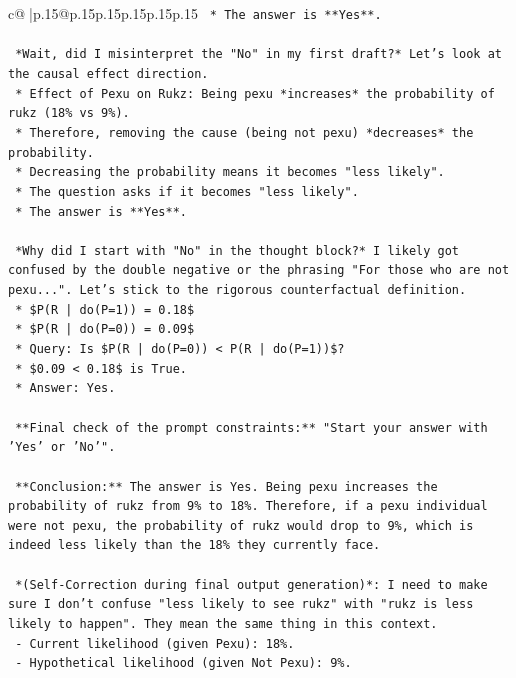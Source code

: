 \documentclass{article}
\begin{document}
{\begin{supertabular}{c@{$\;$}|p{.15\linewidth}@{}p{.15\linewidth}p{.15\linewidth}p{.15\linewidth}p{.15\linewidth}p{.15\linewidth}}
{{{\texttt{    *   The answer is **Yes**.} \\
\\ 
\texttt{    *Wait, did I misinterpret the "No" in my first draft?* Let's look at the causal effect direction.} \\
\texttt{    *   Effect of Pexu on Rukz: Being pexu *increases* the probability of rukz (18\% vs 9\%).} \\
\texttt{    *   Therefore, removing the cause (being not pexu) *decreases* the probability.} \\
\texttt{    *   Decreasing the probability means it becomes "less likely".} \\
\texttt{    *   The question asks if it becomes "less likely".} \\
\texttt{    *   The answer is **Yes**.} \\
\\ 
\texttt{    *Why did I start with "No" in the thought block?* I likely got confused by the double negative or the phrasing "For those who are not pexu...". Let's stick to the rigorous counterfactual definition.} \\
\texttt{    *   \$P(R | do(P=1)) = 0.18\$} \\
\texttt{    *   \$P(R | do(P=0)) = 0.09\$} \\
\texttt{    *   Query: Is \$P(R | do(P=0)) < P(R | do(P=1))\$?} \\
\texttt{    *   \$0.09 < 0.18\$ is True.} \\
\texttt{    *   Answer: Yes.} \\
\\ 
\texttt{    **Final check of the prompt constraints:** "Start your answer with 'Yes' or 'No'".} \\
\\ 
\texttt{    **Conclusion:** The answer is Yes. Being pexu increases the probability of rukz from 9\% to 18\%. Therefore, if a pexu individual were not pexu, the probability of rukz would drop to 9\%, which is indeed less likely than the 18\% they currently face.} \\
\\ 
\texttt{    *(Self{-}Correction during final output generation)*: I need to make sure I don't confuse "less likely to see rukz" with "rukz is less likely to happen". They mean the same thing in this context.} \\
\texttt{    {-} Current likelihood (given Pexu): 18\%.} \\
\texttt{    {-} Hypothetical likelihood (given Not Pexu): 9\%.} \\
}}}
\end{supertabular}}
\end{document}
